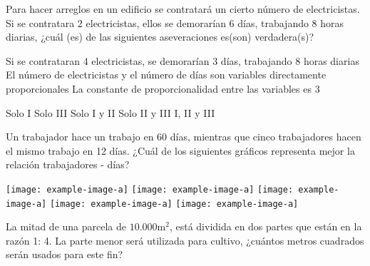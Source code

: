 \documentclass[pagina vacia]{srs}
\begin{document}
\begin{preguntas}
\pregunta Para hacer arreglos en un edificio se contratará un cierto
número de electricistas. Si se contratara 2 electricistas, ellos se demorarían
6 días, trabajando 8 horas diarias, ¿cuál (es) de las siguientes aseveraciones
es(son) verdadera(s)?
\begin{verticali}
\alternativa Si se contrataran 4 electricistas, se demorarían 3 días, trabajando 8 horas diarias
\alternativa El número de electricistas y el número de días son variables directamente proporcionales
\alternativa La constante de proporcionalidad entre las variables es 3
\end{verticali}
\begin{vertical}
\alternativa Solo I
\alternativa Solo III
\alternativa Solo I y II
\alternativa Solo II y III
\alternativa I, II y III
\end{vertical}

\pregunta Un trabajador hace un trabajo en 60 días, mientras que cinco
trabajadores hacen el mismo trabajo en 12 días. ¿Cuál de los siguientes
gráficos representa mejor la relación trabajadores - días?
\begin{alternativasgraficas}
\alternativa \texttt{[image: example-image-a]}
\alternativa \texttt{[image: example-image-a]}
\alternativa \texttt{[image: example-image-a]}
\alternativa \texttt{[image: example-image-a]}
\alternativa \texttt{[image: example-image-a]}
\end{alternativasgraficas}


\pregunta La mitad de una parcela de $10.000 \text{m}^2$, está dividida en
dos partes que están en la razón 1: 4. La parte menor será utilizada para
cultivo, ¿cuántos metros cuadrados serán usados para este fin?
\begin{vertical}
\end{vertical}


\end{preguntas}
\end{document}
